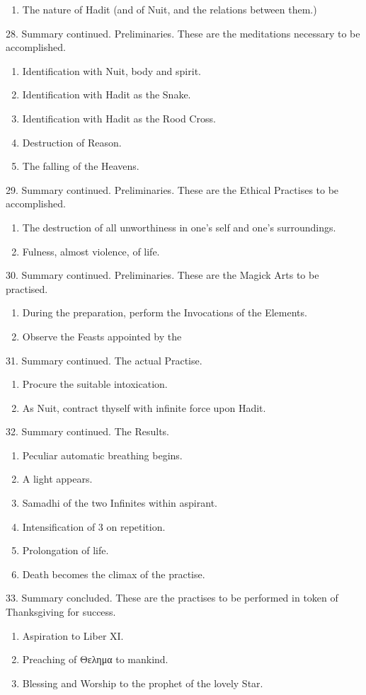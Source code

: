 \begin{enumerate}[leftmargin=4\parindent]
\item The nature of Hadit (and of Nuit, and the relations between them.)
\end{enumerate}

28. Summary continued. Preliminaries. These are the meditations necessary to be accomplished.

\begin{enumerate}[leftmargin=4\parindent]

\item Identification with Nuit, body and spirit.
\item Identification with Hadit as the Snake.
\item Identification with Hadit as the Rood Cross.
\item Destruction of Reason.
\item The falling of the Heavens.
\end{enumerate}

29. Summary continued. Preliminaries. These are the Ethical Practises to be accomplished.
\begin{enumerate}[leftmargin=4\parindent]
\item The destruction of all unworthiness in one's self and one's surroundings.
\item Fulness, almost violence, of life.
\end{enumerate}

30. Summary continued. Preliminaries. These are the Magick Arts to be practised.
\begin{enumerate}[leftmargin=4\parindent]
\item During the preparation, perform the Invocations of the Elements.
\item Observe the Feasts appointed by the \Argentium{}
\end{enumerate}

31. Summary continued. The actual Practise.

\begin{enumerate}[leftmargin=4\parindent]
\item Procure the suitable intoxication.
\item As Nuit, contract thyself with infinite force upon Hadit.
\end{enumerate}

32. Summary continued. The Results.
\begin{enumerate}[leftmargin=4\parindent]
\item Peculiar automatic breathing begins.
\item A light appears.
\item Samadhi of the two Infinites within aspirant.
\item Intensification of 3 on repetition.
\item Prolongation of life.
\item Death becomes the climax of the practise.
\end{enumerate}

33. Summary concluded. These are the practises to be performed in token of Thanksgiving for success.
\begin{enumerate}[leftmargin=4\parindent]
\item Aspiration to Liber XI.
\item Preaching of Θελημα to mankind.
\item Blessing and Worship to the prophet of the lovely Star.
\end{enumerate}

